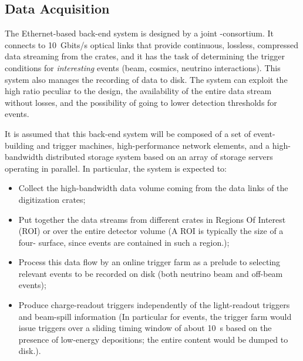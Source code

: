 \subsection{Data Acquisition}
\label{v4:fddp-ov:daq}

The Ethernet-based  back-end system is designed by a joint \single{}-\dual consortium. It connects to %
\SI{10}{Gbits/s} optical links that provide continuous, lossless, compressed data streaming from the  crates, and it has the task of determining the trigger conditions for \textit{interesting} events (beam, cosmics,  neutrino interactions). This system also manages the recording of data to disk. %
The system can exploit the high  ratio peculiar to the \dual design, the availability of the entire data stream without losses, and the possibility of going to lower detection thresholds for  events.

 It  is assumed that this  back-end system will be composed of a set of event-building and trigger machines, high-performance network elements, and a high-bandwidth distributed storage system based on an array of storage servers operating in parallel. In particular, the  system is expected to:

\begin{itemize}
\item Collect the high-bandwidth data volume coming from the data links of the  digitization crates; 
\item Put together the data streams from different crates in Regions Of Interest (ROI) or over the entire detector volume (A ROI is typically the size of a  four- surface, since events are contained in such a region.);
\item Process this data flow by an online trigger farm %
as a prelude to selecting relevant events to be recorded on disk (both neutrino beam and off-beam events);
\item Produce charge-readout triggers independently of the light-readout triggers and beam-spill information %
(In particular for  events, the trigger farm would issue triggers over a sliding timing window of about \SI{10}{s}  based on the presence of low-energy depositions; the entire content would be dumped to disk.).
\end{itemize}

